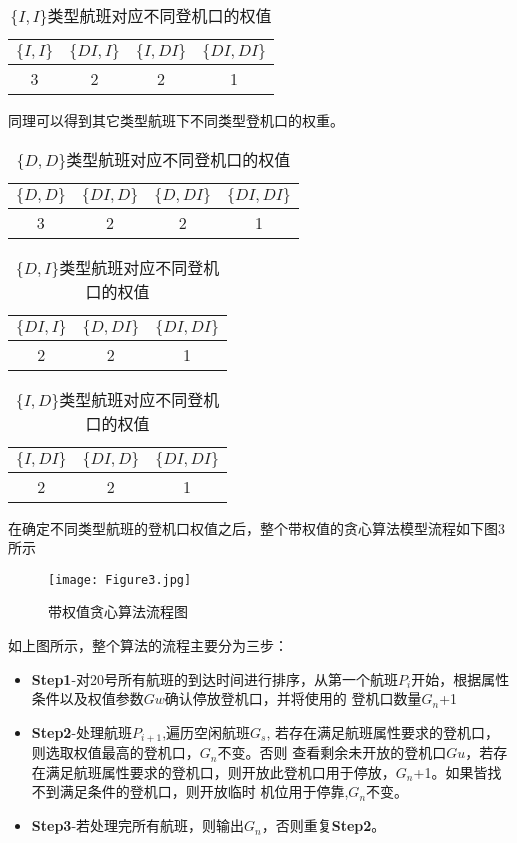 \documentclass[bwprint]{gmcmthesis}
\begin{document}
\begin{table*}[!h]
\centering
\caption{$\{I, I\}$类型航班对应不同登机口的权值}
\begin{tabular}{|c|c|c|c|}
    \hline
    $\{I, I\}$ & $\{DI, I\}$ & $\{I, DI\}$ & $\{DI, DI\}$\\
    \hline
    3&2&2&1\\
    \hline
\end{tabular}
\end{table*}

同理可以得到其它类型航班下不同类型登机口的权重。

\begin{table*}[!h]
    \centering
    \caption{$\{D, D\}$类型航班对应不同登机口的权值}
    \begin{tabular}{|c|c|c|c|}
        \hline
        $\{D, D\}$ & $\{DI, D\}$ & $\{D, DI\}$ & $\{DI, DI\}$\\
        \hline
        3&2&2&1\\
        \hline
    \end{tabular}
\end{table*}
\begin{table*}[!h]
    \centering
    \caption{$\{D, I\}$类型航班对应不同登机口的权值}
    \begin{tabular}{|c|c|c|}
        \hline
        $\{DI, I\}$ & $\{D, DI\}$ & $\{DI, DI\}$\\
        \hline
        2&2&1\\
        \hline
    \end{tabular}
\end{table*}

\begin{table*}[!h]
    \centering
    \caption{$\{I, D\}$类型航班对应不同登机口的权值}
    \begin{tabular}{|c|c|c|}
        \hline
        $\{I, DI\}$ & $\{DI, D\}$ & $\{DI, DI\}$\\
        \hline
        2&2&1\\
        \hline
    \end{tabular}
\end{table*}

在确定不同类型航班的登机口权值之后，整个带权值的贪心算法模型流程如下图3所示
\begin{figure}[!h]
\centering
\texttt{[image: Figure3.jpg]}
\caption{带权值贪心算法流程图}
\end{figure}
如上图所示，整个算法的流程主要分为三步：
\begin{itemize}
\item \textbf{Step1}-对20号所有航班的到达时间进行排序，从第一个航班$P_{i}$开始，根据属性条件以及权值参数$Gw$确认停放登机口，并将使用的
登机口数量$G_{n}$+1
\item \textbf{Step2}-处理航班$P_{i+1}$,遍历空闲航班$G_{s}$, 若存在满足航班属性要求的登机口，则选取权值最高的登机口，$G_{n}$不变。否则
查看剩余未开放的登机口$Gu$，若存在满足航班属性要求的登机口，则开放此登机口用于停放，$G_{n}$+1。如果皆找不到满足条件的登机口，则开放临时
机位用于停靠,$G_{n}$不变。
\item \textbf{Step3}-若处理完所有航班，则输出$G_{n}$，否则重复\textbf{Step2}。
\end{itemize}
\end{document}

